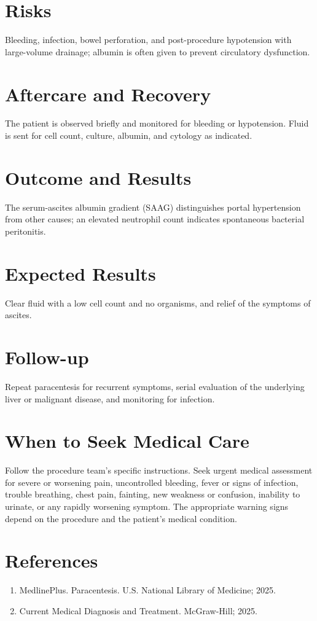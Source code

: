 \section*{Risks}
Bleeding, infection, bowel perforation, and post-procedure hypotension with large-volume drainage; albumin is often given to prevent circulatory dysfunction.

\section*{Aftercare and Recovery}
The patient is observed briefly and monitored for bleeding or hypotension. Fluid is sent for cell count, culture, albumin, and cytology as indicated.

\section*{Outcome and Results}
The serum-ascites albumin gradient (SAAG) distinguishes portal hypertension from other causes; an elevated neutrophil count indicates spontaneous bacterial peritonitis.

\section*{Expected Results}
Clear fluid with a low cell count and no organisms, and relief of the symptoms of ascites.

\section*{Follow-up}
Repeat paracentesis for recurrent symptoms, serial evaluation of the underlying liver or malignant disease, and monitoring for infection.

\section*{When to Seek Medical Care}
Follow the procedure team's specific instructions. Seek urgent medical assessment for severe or worsening pain, uncontrolled bleeding, fever or signs of infection, trouble breathing, chest pain, fainting, new weakness or confusion, inability to urinate, or any rapidly worsening symptom. The appropriate warning signs depend on the procedure and the patient's medical condition.

\section*{References}
\begin{enumerate}
  \item MedlinePlus. Paracentesis. U.S. National Library of Medicine; 2025.
  \item Current Medical Diagnosis and Treatment. McGraw-Hill; 2025.
\end{enumerate}

\clearpage
